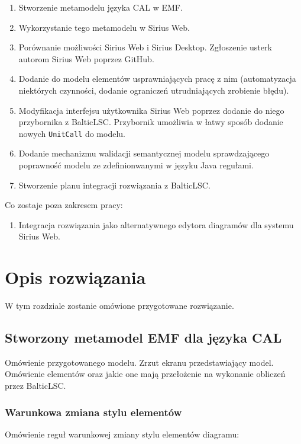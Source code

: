 \begin{enumerate}
	\item Stworzenie metamodelu języka CAL w EMF\@.
	\item Wykorzystanie tego metamodelu w Sirius Web.
	\item Porównanie możliwości Sirius Web i Sirius Desktop. Zgłoszenie usterk autorom Sirius Web poprzez GitHub.
	\item Dodanie do modelu elementów usprawniających pracę z nim (automatyzacja niektórych czynności, dodanie ograniczeń utrudniających zrobienie błędu).
	\item Modyfikacja interfejsu użytkownika Sirius Web poprzez dodanie do niego przybornika z BalticLSC\@. Przybornik umożliwia w łatwy sposób dodanie nowych \texttt{UnitCall} do modelu.
	\item Dodanie mechanizmu walidacji semantycznej modelu sprawdzającego poprawność modelu ze zdefinionwanymi w języku Java regułami.
	\item Stworzenie planu integracji rozwiązania z BalticLSC\@.
\end{enumerate}

\noindent Co zostaje poza zakresem pracy:

\begin{enumerate}
	\item Integracja rozwiązania jako alternatywnego edytora diagramów dla systemu Sirius Web.
\end{enumerate}

\chapter{Opis rozwiązania}

W tym rozdziale zostanie omówione przygotowane rozwiązanie.

\section{Stworzony metamodel EMF dla języka CAL}

Omówienie przygotowanego modelu. Zrzut ekranu przedstawiający model. Omówienie
elementów oraz jakie one mają przełożenie na wykonanie obliczeń przez
BalticLSC\@.

\subsection{Warunkowa zmiana stylu elementów}

Omówienie reguł warunkowej zmiany stylu elementów diagramu:

